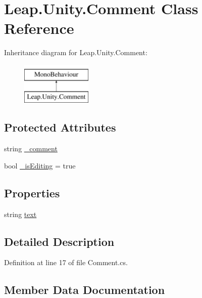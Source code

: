 \hypertarget{class_leap_1_1_unity_1_1_comment}{}\section{Leap.\+Unity.\+Comment Class Reference}
\label{class_leap_1_1_unity_1_1_comment}
Inheritance diagram for Leap.\+Unity.\+Comment\+:\begin{figure}[H]
\begin{center}
\leavevmode
\includegraphics[height=2.000000cm]{class_leap_1_1_unity_1_1_comment}
\end{center}
\end{figure}
\subsection*{Protected Attributes}
\begin{DoxyCompactItemize}
\item 
string \mbox{\hyperlink{class_leap_1_1_unity_1_1_comment_abdfc2dca7e849c3c83095c6c24778333}{\+\_\+comment}}
\item 
bool \mbox{\hyperlink{class_leap_1_1_unity_1_1_comment_a0486c9e426260ebe04619952a89f1451}{\+\_\+is\+Editing}} = true
\end{DoxyCompactItemize}
\subsection*{Properties}
\begin{DoxyCompactItemize}
\item 
string \mbox{\hyperlink{class_leap_1_1_unity_1_1_comment_a21cc1f0a7d0ee692daae8bf5d4844654}{text}}
\end{DoxyCompactItemize}


\subsection{Detailed Description}


Definition at line 17 of file Comment.\+cs.



\subsection{Member Data Documentation}
\mbox{\label{class_leap_1_1_unity_1_1_comment_abdfc2dca7e849c3c83095c6c24778333}} 
